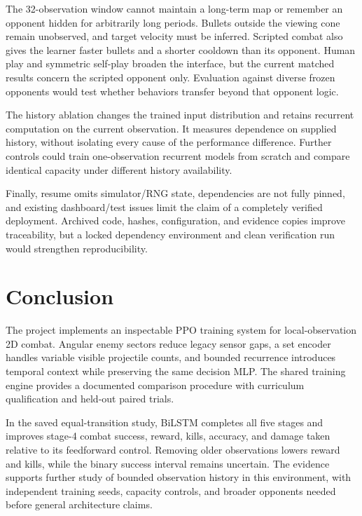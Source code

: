 \documentclass[conference]{IEEEtran}
\begin{document}
The 32-observation window cannot maintain a long-term map or remember an opponent hidden for arbitrarily long periods. Bullets outside the viewing cone remain unobserved, and target velocity must be inferred. Scripted combat also gives the learner faster bullets and a shorter cooldown than its opponent. Human play and symmetric self-play broaden the interface, but the current matched results concern the scripted opponent only. Evaluation against diverse frozen opponents would test whether behaviors transfer beyond that opponent logic.

The history ablation changes the trained input distribution and retains recurrent computation on the current observation. It measures dependence on supplied history, without isolating every cause of the performance difference. Further controls could train one-observation recurrent models from scratch and compare identical capacity under different history availability.

Finally, resume omits simulator/RNG state, dependencies are not fully pinned, and existing dashboard/test issues limit the claim of a completely verified deployment. Archived code, hashes, configuration, and evidence copies improve traceability, but a locked dependency environment and clean verification run would strengthen reproducibility.

\section{Conclusion}
The project implements an inspectable PPO training system for local-observation 2D combat. Angular enemy sectors reduce legacy sensor gaps, a set encoder handles variable visible projectile counts, and bounded recurrence introduces temporal context while preserving the same decision MLP. The shared training engine provides a documented comparison procedure with curriculum qualification and held-out paired trials.

In the saved equal-transition study, BiLSTM completes all five stages and improves stage-4 combat success, reward, kills, accuracy, and damage taken relative to its feedforward control. Removing older observations lowers reward and kills, while the binary success interval remains uncertain. The evidence supports further study of bounded observation history in this environment, with independent training seeds, capacity controls, and broader opponents needed before general architecture claims.

\appendices
\end{document}

